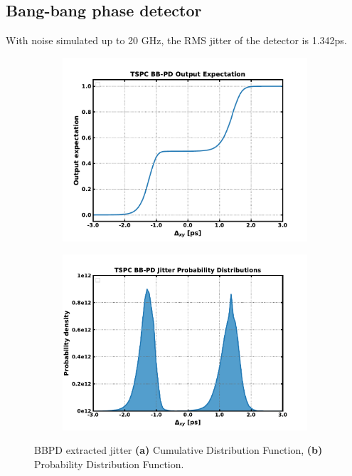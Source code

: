 \FloatBarrier
\subsection{Bang-bang phase detector}\label{sec:res_bbpd}
With noise simulated up to 20 GHz, the RMS jitter of the detector is 1.342ps.

	\begin{figure}[htb!]
	    \centering
	    \begin{subfigure}{0.5\textwidth}
	        \centering
	        \includegraphics[width=1\textwidth, angle=0]{./figs/results/cdf}
	        \caption{ }
	        \label{fig:bbpd_cdf}
	    \end{subfigure}%
	    \begin{subfigure}{0.5\textwidth}
	        \centering
	        \includegraphics[width=1\textwidth, angle=0]{./figs/results/pdf}
	        \caption{ }
	        \label{fig:bbpd_pdf}
	    \end{subfigure}
	    \label{fig:bbpd_jitter_dist}
	    \caption{BBPD extracted jitter \textbf{(a)} Cumulative Distribution Function, \textbf{(b)} Probability Distribution Function.}
	\end{figure} 

